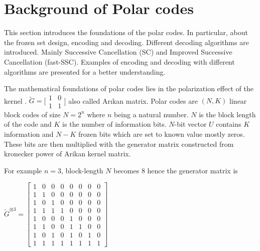 \section{Background of Polar codes} 
This section introduces the foundations of the polar codes. In particular, about the frozen set design, encoding and decoding. Different decoding algorithms are introduced. Mainly Successive Cancellation (SC) and Improved Successive Cancellation (fast-SSC)\cite{fastPolarDecodersAlgoImpl}. Examples of encoding and decoding with different algorithms are presented for a better understanding.


The mathematical foundations of polar codes lies in the polarization effect of the kernel \cite{Arikan}. $ \utilde{G} = \big[\begin{smallmatrix} 1 & 0 \\ 1 & 1 \end{smallmatrix}$\big] also called Ar\i kan matrix. Polar codes are $(N,K)$ linear block codes of size $N = 2^{n}$ where $n$ being a natural number. $N$ is the block length of the code and $K$ is the number of information bits.  $N$-bit vector $U$ contains $K$ information and $N-K$ frozen bits which are set to known value mostly zeros. These bits are then multiplied with the generator matrix constructed from kronecker power\cite{kronecker} of Arikan kernel matrix.

For example $n=3$, block-length $N$ becomes $8$ hence the generator matrix is \newline

$ \utilde{G}^{\otimes 3} = \begin{bmatrix}
1 & 0 & 0 & 0 & 0 & 0 & 0 & 0\\ 
1 & 1 & 0 & 0 & 0 & 0 & 0 & 0\\ 
1 & 0 & 1 & 0 & 0 & 0 & 0 & 0\\ 
1 & 1 & 1 & 1 & 0 & 0 & 0 & 0\\ 
1 & 0 & 0 & 0 & 1 & 0 & 0 & 0\\ 
1 & 1 & 0 & 0 & 1 & 1 & 0 & 0\\ 
1 & 0 & 1 & 0 & 1 & 0 & 1 & 0\\ 
1 & 1 & 1 & 1 & 1 & 1 & 1 & 1
\end{bmatrix}$ \newline

